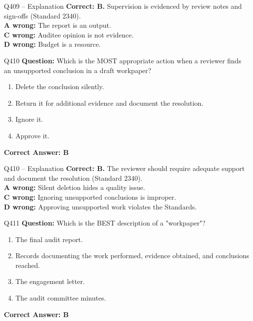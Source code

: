 \documentclass[aspectratio=169,10pt]{beamer}
\begin{document}
	\begin{frame}[t]{Q409 -- Explanation}
		\small
		\textbf{Correct: B.} Supervision is evidenced by review notes and sign-offs (Standard 2340). \\[4pt]
		\textbf{A wrong:} The report is an output. \\[2pt]
		\textbf{C wrong:} Auditee opinion is not evidence. \\[2pt]
		\textbf{D wrong:} Budget is a resource.
	\end{frame}
	
	\begin{frame}[t]{Q410}
		\small
		\textbf{Question:} Which is the MOST appropriate action when a reviewer finds an unsupported conclusion in a draft workpaper?
		\begin{enumerate}[label=\Alph*.,itemsep=1pt,topsep=2pt]
			\item Delete the conclusion silently.
			\item Return it for additional evidence and document the resolution.
			\item Ignore it.
			\item Approve it.
		\end{enumerate}
		\vspace{4pt}
		\textbf{Correct Answer: B}
	\end{frame}
	
	\begin{frame}[t]{Q410 -- Explanation}
		\small
		\textbf{Correct: B.} The reviewer should require adequate support and document the resolution (Standard 2340). \\[4pt]
		\textbf{A wrong:} Silent deletion hides a quality issue. \\[2pt]
		\textbf{C wrong:} Ignoring unsupported conclusions is improper. \\[2pt]
		\textbf{D wrong:} Approving unsupported work violates the Standards.
	\end{frame}
	
	\begin{frame}[t]{Q411}
		\small
		\textbf{Question:} Which is the BEST description of a "workpaper"?
		\begin{enumerate}[label=\Alph*.,itemsep=1pt,topsep=2pt]
			\item The final audit report.
			\item Records documenting the work performed, evidence obtained, and conclusions reached.
			\item The engagement letter.
			\item The audit committee minutes.
		\end{enumerate}
		\vspace{4pt}
		\textbf{Correct Answer: B}
	\end{frame}
	
\end{document}
